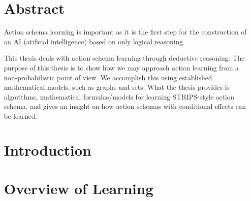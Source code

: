 \documentclass[10pt,twoside]{book}                  %
\theoremstyle{definition}
\theoremstyle{plain}
\begin{document}
\prefrontmatter
\frontmatter
{}     
\chapter{Abstract}
 
Action schema learning is important as it is the first step for the construction of an AI (atificial intelligence) based on only logical reasoning. 

This thesis deals with action schema learning through deductive reasoning.
The purpose of this thesis is to show how we may approach action learning from a non-probabilistic point of view. 
We accomplish this using established mathematical models, such as graphs and sets. 
What the thesis provides is algorithms, mathematical formulas/models for learning STRIPS-style action schema, and gives an insight on how action schemas with conditional effects can be learned.



\markboth{}{}                                       %
\markboth{}{}                                       %
\markboth{}{}                                       %
\markboth{}{}                                       %
\newpage\mbox{}\newpage
{}
\renewcommand{\sectionmark}[1]{\markright{#1}}
\sectionmark{Contents}
\addtolength{\parskip}{-\baselineskip}
\tableofcontents
\listofalgorithms
\addtolength{\parskip}{\baselineskip}
\renewcommand{\sectionmark}[1]{\markright{\thesection\ #1}}

\mainmatter
\chapter{Introduction}
	

\chapter{Overview of Learning} \label{sec:Learning}
    
\end{document}
